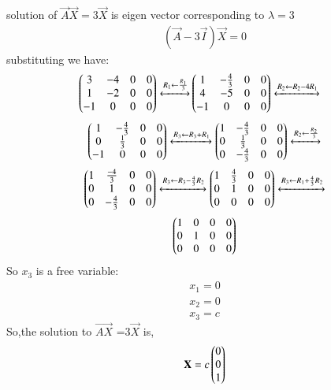  solution of $\vec{A}\vec{X}=3\vec{X}$ is eigen vector corresponding to $\lambda=3$ 
 \begin{align}\label{eq:solutions/1/2/3/eq11}
(\vec{A}-3\vec{I})\vec X=0
\end{align}
substituting we have:
\begin{align}
\begin{pmatrix}3& -4&0&0\\
1 & -2 & 0&0\\
-1 & 0 &0&0
\end{pmatrix}
\xleftrightarrow[]{R_1 \leftarrow \frac{R_1}{3} }\nonumber
&
\begin{pmatrix}1&-\frac{4}{3}&0&0\\
4&-5&0&0\\
-1&0&0&0\end{pmatrix}\xleftrightarrow[]{R_2 \leftarrow R_2-4R_1} 
\end{align}
\begin{align}
    \begin{pmatrix}1&-\frac{4}{3}&0&0\\
            0&\frac{1}{3}&0&0\\
            -1&0&0&0\end{pmatrix}
    \xleftrightarrow[]{R_3 \leftarrow R_3+R_1 }\nonumber
    \begin{pmatrix}1&-\frac{4}{3}&0&0\\
            0&\frac{1}{3}&0&0\\
            0&-\frac{4}{3}&0&0\end{pmatrix}
            \xleftrightarrow[]{R_2 \leftarrow\frac{R_2}{3} }\nonumber
\end{align}
\begin{align}
    \begin{pmatrix}1&\frac{-4}{3}&0&0\\
    0&1&0&0\\
    0&-\frac{4}{3}&0&0\end{pmatrix}
    \xleftrightarrow[]{R_3 \leftarrow R_3-\frac{4}{3}R_2} \nonumber
    \begin{pmatrix}1&\frac{4}{3}&0&0\\
           0&1&0&0\\
         0&0&0&0\end{pmatrix}    \nonumber
          \xleftrightarrow[]{R_3 \leftarrow R_1+\frac{4}{3}R_2}
\end{align}
\begin{align} \label{eq:solutions/1/2/3/eq:eq_15}
    \begin{pmatrix}1&0&0&0\\
    0&1&0&0\\
    0&0&0&0\end{pmatrix} 
\end{align}
So $x_3$ is a free variable:
\begin{align}
  x_1=0\\
  x_2=0\\
  x_3=c
\end{align}
 So,the solution to $\vec {AX}$ =3$\vec{X}$ is,
 \begin{align}\label{eq:solutions/1/2/3/eq:222}
 \mathbf{X} =
 c
 \begin{pmatrix}
 0\\0\\1
 \end{pmatrix}
 \end{align}

   


